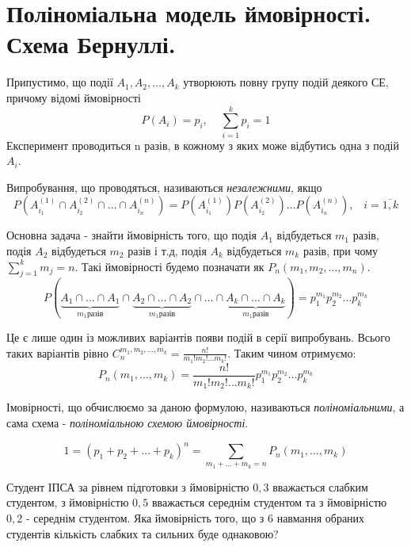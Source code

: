 
\section{Поліноміальна модель ймовірності. Схема Бернуллі.}
Припустимо, що події $A_1, A_2, \dots, A_k$ утворюють повну групу подій деякого 
СЕ, причому відомі ймовірності $$P(A_i) = p_i,\;\;\;\; \sum_{i=1}^k p_i = 1$$
Експеримент проводиться n разів, в кожному з яких може відбутись одна з 
подій $A_i$. 
\begin{definition}
    Випробування, що проводяться, називаються \emph{незалежними}, якщо 
    $$P(A_{i_1}^{(1)} \cap A_{i_2}^{(2)} \cap \dots \cap A_{i_n}^{(n)}) = 
    P(A_{i_1}^{(1)}) P(A_{i_2}^{(2)}) \dots P(A_{i_n}^{(n)}),\;\;\;
    i=\overline{1,k}$$
\end{definition}

Основна задача - знайти ймовірність того, що подія $A_1$ відбудеться $m_1$ разів, 
подія $A_2$ відбудеться $m_2$ разів і т.д, подія $A_k$ відбудеться $m_k$ разів, при 
чому $\sum_{j=1}^k m_j = n$. Такі ймовірності будемо позначати як $P_n(m_1, m_2, \dots, m_n)$.
$$P(\underbrace{A_1 \cap \dots \cap A_1}_{m_1 \text{разів}} 
\cap \underbrace{ A_2 \cap \dots \cap A_2}_{m_1 \text{разів}}
\cap \dots \cap  \underbrace{A_k \cap \dots \cap A_k}_{m_1 \text{разів}})
= p_1^{m_1} p_2^{m_2} \dots p_k^{m_k}$$

Це є лише один із можливих варіантів появи подій в серії випробувань. Всього таких варіантів 
рівно $C_n^{m_1, m_2, \dots, m_k} = \frac{n!}{m_1!m_2! \dots m_k!}$. Таким чином отримуємо:
$$P_n(m_1, \dots, m_k) = \frac{n!}{m_1!m_2! \dots m_k!} p_1^{m_1} p_2^{m_2} \dots p_k^{m_k}$$
\begin{definition}
    Імовірності, що обчислюємо за даною формулою, називаються \emph{поліноміальними}, а 
    сама схема - \emph{поліноміальною схемою ймовірності}. 
\end{definition}
\begin{remark}
    $$1 = (p_1 + p_2 + \dots + p_k)^n = \sum_{m_1 + \dots + m_k = n} P_n(m_1, \dots, m_k)$$
\end{remark}
\begin{example}
    Студент ІПСА за рівнем підготовки з ймовірністю $0,3$ вважається слабким студентом, 
    з ймовірністю $0,5$ вважається середнім студентом та 
    з ймовірністю $0,2$ - середнім студентом. Яка ймовірність того, що з 6 навмання 
    обраних студентів кількість слабких та сильних буде однаковою?
\end{example}